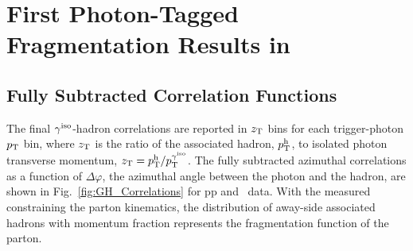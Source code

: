 







\chapter{First Photon-Tagged Fragmentation Results in \pPb}

\section{Fully Subtracted Correlation Functions}
\label{sec:decaybkgsubtraction}
The final $ \gamma^\mathrm{iso}$-hadron correlations are reported in $z_{\mathrm{T}}$  bins for each trigger-photon $p_{\mathrm{T}}$ bin, where $z_{\mathrm{T}}$ is the ratio of the associated hadron, $p_{\mathrm{T}}^\mathrm{h}$, to isolated photon transverse momentum, $z_{\mathrm{T}} = p_{\mathrm{T}}^{\mathrm{h}}/p_{\mathrm{T}}^{\gamma^\mathrm{iso}}$. The fully subtracted azimuthal correlations as a function of $ \Delta\varphi$, the azimuthal angle between the photon and the hadron, are shown in Fig.~\ref{fig:GH_Correlations} for pp and \pPb~data. With the measured \gammaiso~ constraining the parton kinematics, the distribution of away-side associated hadrons with momentum fraction \zt represents the fragmentation function of the parton.

